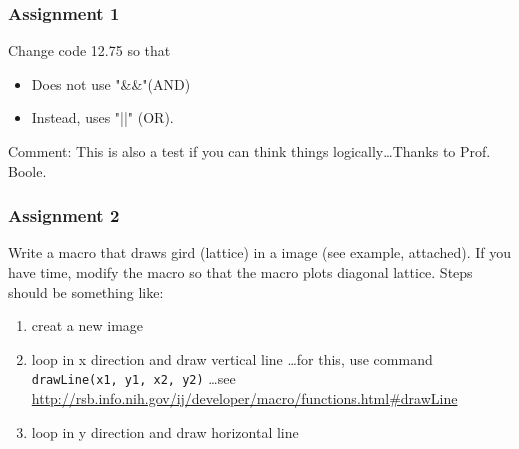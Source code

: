 \documentclass[11pt,a4paper,oneside]{report}
\newcommand{\ilcom}[1]{\texttt{\small#1}}
\begin{document}
\subsubsection{Assignment 1}
Change code 12.75 so that 
\begin{itemize}
\item Does not use "\&\&"(AND) 
\item Instead, uses "||" (OR). 
\end{itemize}

Comment: This is also a test if you can think things logically\ldots Thanks to Prof. Boole. 

\subsubsection{Assignment 2}

Write a macro that draws gird (lattice) in a image (see example, attached).
If you have time, modify the macro so that the macro plots diagonal lattice.
Steps should be something like:
\begin{enumerate}
\item creat a new image
\item loop in x direction and draw vertical line
\dots for this, use command \ilcom{drawLine(x1, y1, x2, y2)}
\dots see
\url{http://rsb.info.nih.gov/ij/developer/macro/functions.html#drawLine}
\item loop in y direction and draw horizontal line
\end{enumerate}
\end{document}
